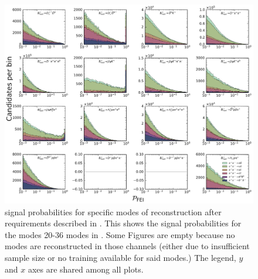 \begin{figure}[htbp!]
    \ContinuedFloat
    \centering
    \includegraphics[width=1\textwidth]{figures/appendices/FEI_signal_probabilities/Bp_feiSigProbs2.pdf}
    \caption{\label{fig:feisigprobs2} \FEI signal probabilities for specific modes of \Bp reconstruction after requirements described in .
    This shows the signal probabilities for the modes 20-36 \Bp modes in .
    Some Figures are empty because no modes are reconstructed in those channels (either due to insufficient sample size or no training available for said modes.)
    The legend, $y$ and $x$ axes are shared among all plots.
    }
\end{figure}

